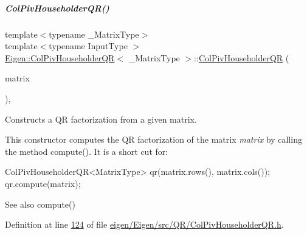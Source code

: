 \mbox{\label{group___q_r___module_a1aa6a5b95380df0ceb224cb833316d4f}} 
\subparagraph{\texorpdfstring{Col\+Piv\+Householder\+Q\+R()}{ColPivHouseholderQR()}\hspace{0.1cm}{\footnotesize\ttfamily [3/8]}}
{\footnotesize\ttfamily template$<$typename \+\_\+\+Matrix\+Type$>$ \\
template$<$typename Input\+Type $>$ \\
\hyperlink{group___q_r___module_class_eigen_1_1_col_piv_householder_q_r}{Eigen\+::\+Col\+Piv\+Householder\+QR}$<$ \+\_\+\+Matrix\+Type $>$\+::\hyperlink{group___q_r___module_class_eigen_1_1_col_piv_householder_q_r}{Col\+Piv\+Householder\+QR} (\begin{DoxyParamCaption}\item[{const \hyperlink{group___core___module_struct_eigen_1_1_eigen_base}{Eigen\+Base}$<$ Input\+Type $>$ \&}]{matrix }\end{DoxyParamCaption})\hspace{0.3cm}{\ttfamily [inline]}, {\ttfamily [explicit]}}



Constructs a QR factorization from a given matrix. 

This constructor computes the QR factorization of the matrix {\itshape matrix} by calling the method compute(). It is a short cut for\+:


\begin{DoxyCode}
ColPivHouseholderQR<MatrixType> qr(matrix.rows(), matrix.cols());
qr.compute(matrix);
\end{DoxyCode}


\begin{DoxySeeAlso}{See also}
compute() 
\end{DoxySeeAlso}


Definition at line \hyperlink{eigen_2_eigen_2src_2_q_r_2_col_piv_householder_q_r_8h_source_l00124}{124} of file \hyperlink{eigen_2_eigen_2src_2_q_r_2_col_piv_householder_q_r_8h_source}{eigen/\+Eigen/src/\+Q\+R/\+Col\+Piv\+Householder\+Q\+R.\+h}.

